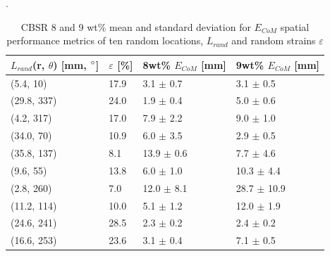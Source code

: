 \begin{table}[H]
    \caption{CBSR 8 and 9 wt\% mean and standard deviation for $E_{CoM}$ spatial performance metrics of ten random locations, $L_{rand}$ and random strains $\varepsilon$}. %
    \label{tab:spatial_ecom_metrics_stats_8p_rand_loads}
    \centering
    \begin{tabular}{p{2.6cm}p{1.0cm}p{2.0cm}p{2.0cm}}
        \hline       
        $L_{rand}$(r, $\theta$) [mm, $\degree$] & $\varepsilon$ [\%] & 8wt\% $E_{CoM}$ [mm] & 9wt\% $E_{CoM}$ [mm] \\ \hline
        (5.4, 10) & 17.9 & 3.1 $\pm$ 0.7 & 3.1 $\pm$ 0.5 \\
        (29.8, 337) & 24.0 & 1.9 $\pm$ 0.4 & 5.0 $\pm$ 0.6 \\
        (4.2, 317) & 17.0 & 7.9 $\pm$ 2.2 & 9.0 $\pm$ 1.0 \\
        (34.0, 70) & 10.9 & 6.0 $\pm$ 3.5 & 2.9 $\pm$ 0.5 \\
        (35.8, 137) & 8.1 & 13.9 $\pm$ 0.6 & 7.7 $\pm$ 4.6 \\
        (9.6, 55) & 13.8 & 6.0 $\pm$ 1.0 & 10.3 $\pm$ 4.4 \\
        (2.8, 260) & 7.0 & 12.0 $\pm$ 8.1 & 28.7 $\pm$ 10.9 \\
        (11.2, 114) & 10.0 & 5.1 $\pm$ 1.2 & 12.0 $\pm$ 1.9 \\
        (24.6, 241) & 28.5 & 2.3 $\pm$ 0.2 & 2.4 $\pm$ 0.2 \\
        (16.6, 253) & 23.6 & 3.1 $\pm$ 0.4 & 7.1 $\pm$ 0.5 \\
        \hline
    \end{tabular}
\end{table}

